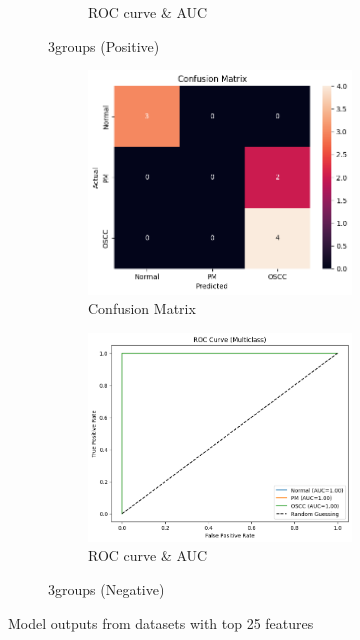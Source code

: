 \documentclass[a4paper,12pt]{article}
\begin{document}
\begin{figure}[H]
\begin{subfigure}[b]{0.45\textwidth}
\begin{subfigure}[b]{0.49\textwidth}
			\caption{ROC curve \& AUC}
			\label{fig:fig6}
		\end{subfigure}
		\caption{3groups (Positive)}
		\label{subfig:3}
	\end{subfigure}
	\hfill
	\begin{subfigure}[b]{0.45\textwidth}
		\centering
		\begin{subfigure}[b]{0.49\textwidth}
			\centering
			\includegraphics[width=\textwidth]{images/3nsl1c.png}  %
			\caption{Confusion Matrix}
			\label{fig:fig7}
		\end{subfigure}
		\hfill
		\begin{subfigure}[b]{0.49\textwidth}
			\centering
			\includegraphics[width=\textwidth]{images/3nsl1r.png}  %
			\caption{ROC curve \& AUC}
			\label{fig:fig8}
		\end{subfigure}
		\caption{3groups (Negative)}
		\label{subfig:4}
	\end{subfigure}

	\caption{Model outputs from datasets with top 25 features}
	\label{fig:grid}
\end{figure}
\end{document}
